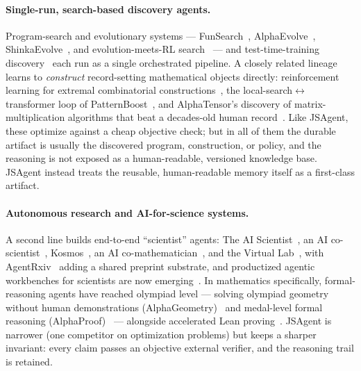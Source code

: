 \documentclass[11pt]{article}
\begin{document}
\paragraph{Single-run, search-based discovery agents.}
Program-search and evolutionary systems --- FunSearch~\cite{romeraparedes2023funsearch},
AlphaEvolve~\cite{novikov2025alphaevolve}, ShinkaEvolve~\cite{lange2025shinkaevolve}, and
evolution-meets-RL search~\cite{surina2025algorithmdiscovery} --- and test-time-training
discovery~\cite{yuksekgonul2026tttdiscover} each run as a single orchestrated pipeline. A
closely related lineage learns to \emph{construct} record-setting mathematical objects
directly: reinforcement learning for extremal combinatorial
constructions~\cite{wagner2021constructions}, the local-search$\leftrightarrow$transformer loop
of PatternBoost~\cite{charton2024patternboost}, and AlphaTensor's discovery of matrix-multiplication
algorithms that beat a decades-old human record~\cite{fawzi2022discovering}. Like JSAgent, these
optimize against a cheap objective check; but in all of them the durable artifact is usually the
discovered program, construction, or policy, and the reasoning is not exposed as a human-readable,
versioned knowledge base. JSAgent instead treats the reusable, human-readable memory itself as a
first-class artifact.

\paragraph{Autonomous research and AI-for-science systems.}
A second line builds end-to-end ``scientist'' agents: The AI
Scientist~\cite{lu2024aiscientist,yamada2025aiscientistv2}, an AI
co-scientist~\cite{gottweis2025coscientist}, Kosmos~\cite{mitchener2025kosmos}, an AI
co-mathematician~\cite{zheng2026comathematician}, and the Virtual
Lab~\cite{swanson2025virtuallab}, with AgentRxiv~\cite{schmidgall2025agentrxiv} adding a shared
preprint substrate, and productized agentic workbenches for scientists are now
emerging~\cite{anthropic2026claudescience}. In mathematics specifically, formal-reasoning agents have reached olympiad
level --- solving olympiad geometry without human demonstrations (AlphaGeometry)~\cite{trinh2024solving}
and medal-level formal reasoning (AlphaProof)~\cite{hubert2025olympiad} --- alongside accelerated
Lean proving~\cite{kung2026leap,yang2024formalmath}.
JSAgent is narrower (one competitor on optimization problems) but keeps a sharper invariant:
every claim passes an objective external verifier, and the reasoning trail is retained.
\end{document}
